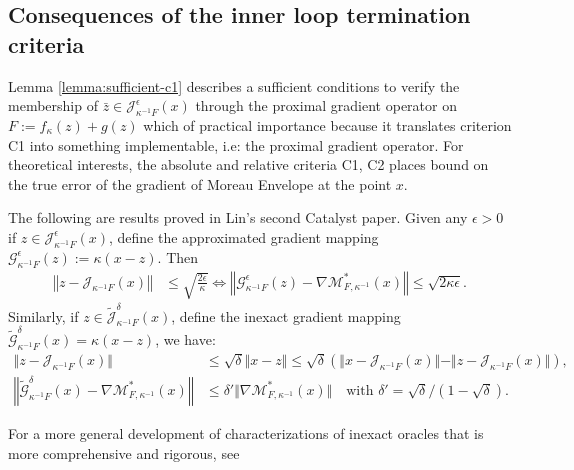 \documentclass[12pt]{article}
\begin{document}
    \subsection{Consequences of the inner loop termination criteria}
        Lemma \ref{lemma:sufficient-c1} describes a sufficient conditions to verify the membership of $\bar z \in \mathcal J_{\kappa^{-1}F}^\epsilon (x)$ through the proximal gradient operator on $F:= f_\kappa(z) + g(z)$ which of practical importance because it translates criterion C1 into something implementable, i.e: the proximal gradient operator. 
        For theoretical interests, the absolute and relative criteria C1, C2 places bound on the true error of the gradient of Moreau Envelope at the point $x$. 
        \par 
        The following are results proved in Lin's second Catalyst paper. 
        Given any $\epsilon > 0$ if $z \in \mathcal J_{\kappa^{-1}F}^\epsilon (x)$, define the approximated gradient mapping $\mathcal G_{\kappa^{-1}F}^\epsilon (z) := \kappa(x - z)$.
        Then
        \begin{align*}
            \left\Vert z - \mathcal J_{\kappa^{-1}F} (x)\right\Vert
            &\le \sqrt{\frac{2\epsilon}{\kappa}} 
            \iff 
            \left\Vert
                \mathcal G_{\kappa^{-1}F}^\epsilon(z) 
                - \nabla \mathcal M_{F, \kappa^{-1}}^*(x)
            \right\Vert 
            \le \sqrt{2\kappa\epsilon}. 
        \end{align*}
        Similarly, if $z \in \widetilde{\mathcal J}_{\kappa^{-1}F}^\delta(x)$, define the inexact gradient mapping $\widetilde{\mathcal G}_{\kappa^{-1}F}^\delta(x) = \kappa(x - z)$, we have: 
        \begin{align*}
            \Vert z - \mathcal J_{\kappa^{-1}F}(x)\Vert 
            &\le \sqrt{\delta}\Vert x - z\Vert 
            \le \sqrt{\delta}(
                \Vert x - \mathcal J_{\kappa^{-1}F} (x) \Vert 
                - \Vert z - \mathcal J_{\kappa^{-1}F} (x) \Vert
            ), 
            \\
            \left\Vert 
                \widetilde{\mathcal G}_{\kappa^{-1}F}^\delta(x) - 
                \nabla \mathcal M^*_{F, \kappa^{-1}}(x) 
            \right\Vert
            &\le 
            \delta' \Vert \nabla \mathcal M^*_{F, \kappa^{-1}}(x) \Vert \quad 
            \text{with } \delta' = \sqrt{\delta}/(1 - \sqrt{\delta}). 
        \end{align*}
        \par 
        For a more general development of characterizations of inexact oracles that is more comprehensive and rigorous, see 
\end{document}
